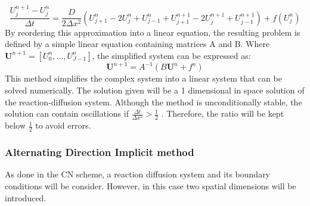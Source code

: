 \begin{equation}
    \frac{U^{n+1}_{j} - U^{n}_{j} }{\Delta t} = \frac{D}{2\Delta x^{2}}\left( U^{n}_{j+1} -  2U^{n}_{j} + U^{n}_{j-1} + U^{n+1}_{j+1} - 2U^{n+1}_{j} + U^{n+1}_{j-1}\right) +  f( U^{n}_{j})
\end{equation}
By reordering this approximation into a linear equation, the resulting problem is defined by a simple linear equation containing matrices A and B. Where $\textbf{U}^{n+1} = [U^{n}_{0}, ... , U^{n}_{J-1}]$, the simplified system can be expressed as:
\begin{equation}
    \textbf{U}^{n+1} = A^{-1}(B\textbf{U}^{n} + f^{n})
\end{equation}
This method simplifies the complex system into a linear system that can be solved numerically. The solution given will be a 1 dimensional in space solution of the reaction-diffusion system. Although the method is  unconditionally stable, the solution can contain oscillations if $ \frac{\Delta t}{\Delta x^{2}} >\frac{1}{2} $ \parencite{trefethen1996finite}. Therefore, the ratio will be kept below $\frac{1}{2}$ to avoid errors.

\subsubsection{Alternating Direction Implicit method}\label{ADI}
As done in the CN scheme, a reaction diffusion system and its boundary conditions will be consider. However, in this case two spatial dimensions will be introduced.

